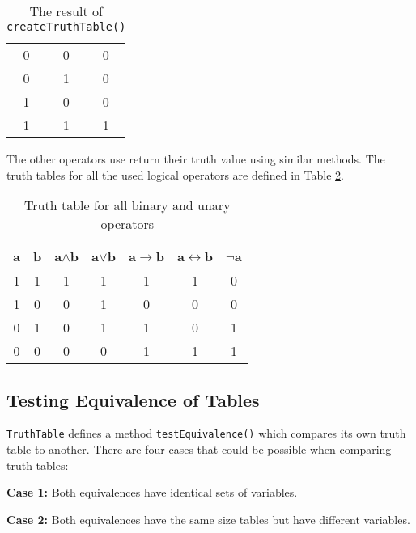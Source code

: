 \documentclass{report}
\begin{document}
\begin{table}[h]
  \begin{center}
    \begin{tabular}{ || c | c || c || }
      \hline
      0 & 0 & 0 \\
      0 & 1 & 0 \\
      1 & 0 & 0 \\
      1 & 1 & 1 \\
      \hline
    \end{tabular}
  \end{center}
  \caption{The result of {\tt createTruthTable()}}
  \label{table:final_generated_table}
\end{table}

The other operators use return their truth value using similar methods. The truth tables for all the used logical operators are defined in Table \ref{table:logical_operators}.

\begin{table}[h]
  \begin{center}
    \begin{tabular}{ || c | c || c | c | c | c | c || }
      \hline
      a & b & a$\land$b & a$\lor$b & a$\to$b & a$\leftrightarrow$b & $\lnot$a \\ \hline
      1 & 1 & 1 & 1 & 1 & 1 & 0 \\
      1 & 0 & 0 & 1 & 0 & 0 & 0 \\
      0 & 1 & 0 & 1 & 1 & 0 & 1 \\
      0 & 0 & 0 & 0 & 1 & 1 & 1 \\
      \hline
    \end{tabular}
  \end{center}
  \caption{Truth table for all binary and unary operators}
  \label{table:logical_operators}
\end{table}

\subsection{Testing Equivalence of Tables}

{\tt TruthTable} defines a method {\tt testEquivalence()} which compares its own truth table to another. There are four cases that could be possible when comparing truth tables:

\textbf{Case 1: } Both equivalences have identical sets of variables.

\textbf{Case 2: } Both equivalences have the same size tables but have different variables.
\end{document}
